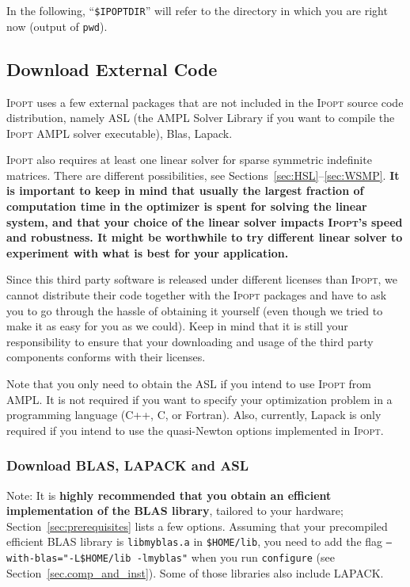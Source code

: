 \documentclass[10pt]{article}
\newcommand{\Ipopt}{\textsc{Ipopt}\xspace}
\begin{document}
In the following, ``\texttt{\$IPOPTDIR}'' will refer to the directory in
which you are right now (output of \texttt{pwd}).

\subsection{Download External Code}\label{ExternalCode}
\Ipopt uses a few external packages that are not included in the
\Ipopt source code distribution, namely ASL (the AMPL Solver Library
if you want to compile the \Ipopt AMPL solver executable), Blas,
Lapack.

\Ipopt also requires at least one linear solver for sparse symmetric
indefinite matrices. There are
different possibilities, see Sections~\ref{sec:HSL}--\ref{sec:WSMP}.
{\bf It is important to keep in mind that usually
the largest fraction of computation time in the optimizer is spent for
solving the linear system, and that your choice of the linear solver
impacts \Ipopt's speed and robustness.  It might be worthwhile to try
different linear solver to experiment with what is best for your
application.}


Since this third party software is released under different licenses than
\Ipopt, we cannot distribute their code together with the \Ipopt
packages and have to ask you to go through the hassle of obtaining it
yourself (even though we tried to make it as easy for you as we
could).  Keep in mind that it is still your responsibility to ensure
that your downloading and usage of the third party components conforms
with their licenses.

Note that you only need to obtain the ASL if you intend to use \Ipopt
from AMPL.  It is not required if you want to specify your
optimization problem in a programming language (C++, C, or Fortran).
Also, currently, Lapack is only required if you intend to use the
quasi-Newton options implemented in \Ipopt.

\subsubsection{Download BLAS, LAPACK and ASL}
Note: It is \textbf{highly recommended that you obtain an efficient
  implementation of the BLAS library}, tailored to your hardware;
Section~\ref{sec:prerequisites} lists a few options.  Assuming that
your precompiled efficient BLAS library is \texttt{libmyblas.a} in
\texttt{\$HOME/lib}, you need to add the flag
\texttt{--with-blas="-L\$HOME/lib -lmyblas"} when you run
\texttt{configure} (see Section~\ref{sec.comp_and_inst}).  Some of
those libraries also include LAPACK.
\end{document}

